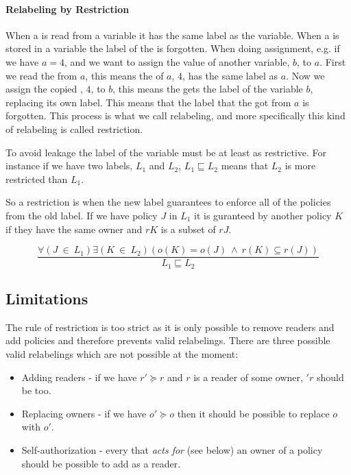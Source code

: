 \paragraph{Relabeling by Restriction}
When a \xvalue{} is read from a variable it has the same label as the variable.
When a \xvalue{} is stored in a variable the label of the \xvalue{} is forgotten.
When doing assignment, e.g. if we have $a = 4$, and we want to assign the value of another variable, $b$, to $a$.
First we read the \xvalue{} from $a$, this means the \xvalue{} of $a$, $4$, has the same label as $a$.
Now we assign the copied \xvalue{}, $4$, to $b$, this means the \xvalue{} gets the label of the variable $b$, replacing its own label.
This means that the label that the \xvalue{} got from $a$ is forgotten.
This process is what we call relabeling, and more specifically this kind of relabeling is called restriction.

To avoid leakage the label of the variable must be at least as restrictive.
For instance if we have two labels, $L_1$ and $L_2$, $L_1 \sqsubseteq L_2$ means that $L_2$ is more restricted than $L_1$.

So a restriction is when the new label guarantees to enforce all of the policies from the old label.
If we have policy $J$ in $L_1$ it is guranteed by another policy $K$ if they have the same owner and $rK$ is a subset of $rJ$.
\begin{definition}
$$\frac{\forall (J \ \in \ L_1) \exists (K \ \in \ L_2)(o(K) = o(J) \ \wedge \ r(K) \subseteq r(J))}{L_1 \sqsubseteq L_2}$$
\end{definition}

\subsection{Limitations}
The rule of restriction is too strict as it is only possible to remove readers and add policies  and therefore prevents valid relabelings.
There are three possible valid relabelings which are not possible at the moment:

\begin{itemize}
\item Adding readers - if we have $r' \succeq r$ and $r$ is a reader of some owner, $'r$ should be too.
\item Replacing owners - if we have $o' \succeq o$ then it should be possible to replace $o$ with $o'$.
\item Self-authorization - every \principal{} that \textit{acts for} (see below) an owner of a policy should be possible to add as a reader.
\end{itemize}

